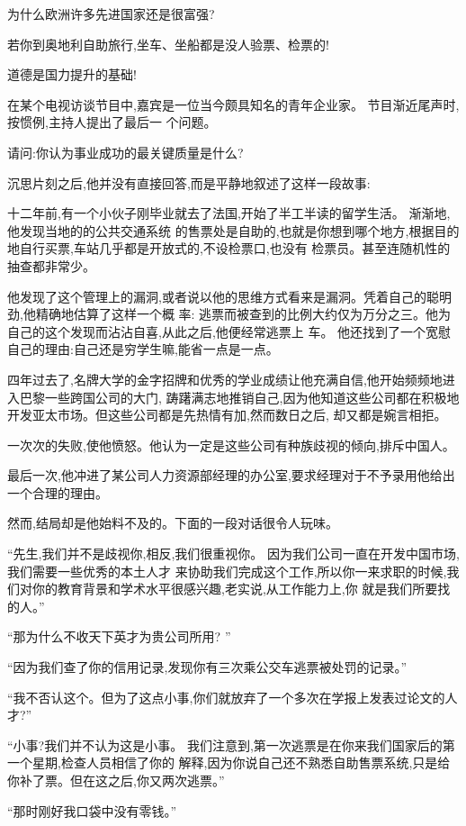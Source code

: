 \documentclass[11pt]{article}
\begin{document}
为什么欧洲许多先进国家还是很富强?
 
若你到奥地利自助旅行,坐车、坐船都是没人验票、检票的!

道德是国力提升的基础!

在某个电视访谈节目中,嘉宾是一位当今颇具知名的青年企业家。 节目渐近尾声时,按惯例,主持人提出了最后一
个问题。

请问:你认为事业成功的最关键质量是什么?

沉思片刻之后,他并没有直接回答,而是平静地叙述了这样一段故事:

十二年前,有一个小伙子刚毕业就去了法国,开始了半工半读的留学生活。 渐渐地,他发现当地的的公共交通系统
的售票处是自助的,也就是你想到哪个地方,根据目的地自行买票,车站几乎都是开放式的,不设检票口,也没有
检票员。甚至连随机性的抽查都非常少。

他发现了这个管理上的漏洞,或者说以他的思维方式看来是漏洞。凭着自己的聪明劲,他精确地估算了这样一个概
率: 逃票而被查到的比例大约仅为万分之三。他为自己的这个发现而沾沾自喜,从此之后,他便经常逃票上
车。 他还找到了一个宽慰自己的理由:自己还是穷学生嘛,能省一点是一点。

四年过去了,名牌大学的金字招牌和优秀的学业成绩让他充满自信,他开始频频地进入巴黎一些跨国公司的大门,
踌躇满志地推销自己,因为他知道这些公司都在积极地开发亚太市场。但这些公司都是先热情有加,然而数日之后,
却又都是婉言相拒。

一次次的失败,使他愤怒。他认为一定是这些公司有种族歧视的倾向,排斥中国人。

最后一次,他冲进了某公司人力资源部经理的办公室,要求经理对于不予录用他给出一个合理的理由。

然而,结局却是他始料不及的。下面的一段对话很令人玩味。

``先生,我们并不是歧视你,相反,我们很重视你。 因为我们公司一直在开发中国市场,我们需要一些优秀的本土人才
来协助我们完成这个工作,所以你一来求职的时候,我们对你的教育背景和学术水平很感兴趣,老实说,从工作能力上,你
就是我们所要找的人。''

``那为什么不收天下英才为贵公司所用? '' 

``因为我们查了你的信用记录,发现你有三次乘公交车逃票被处罚的记录。'' 

``我不否认这个。但为了这点小事,你们就放弃了一个多次在学报上发表过论文的人才?'' 

``小事?我们并不认为这是小事。 我们注意到,第一次逃票是在你来我们国家后的第一个星期,检查人员相信了你的
解释,因为你说自己还不熟悉自助售票系统,只是给你补了票。但在这之后,你又两次逃票。''

``那时刚好我口袋中没有零钱。'' 
\end{document}
